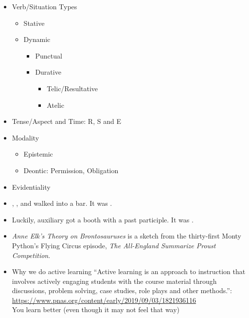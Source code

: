 \documentclass[headrule,footrule]{foils}
\begin{document}
\begin{itemize}\addtolength{\itemsep}{-1ex}
\item Verb/Situation Types
\begin{itemize}
\item Stative 
\item  Dynamic
  \begin{itemize}
  \item  Punctual
  \item  Durative
    \begin{itemize}
    \item  Telic/Resultative 
    \item  Atelic
    \end{itemize}
  \end{itemize}
\end{itemize}
\item Tense/Aspect and Time: R, S and E
\item Modality
  \begin{itemize}
  \item Epistemic
  \item Deontic: Permission, Obligation
  \end{itemize}
\item Evidentiality
\end{itemize}


\begin{itemize}
\item {}, , and  walked into a bar. It was .
\item Luckily, auxiliary  got a booth with a past participle. It was .
\end{itemize}



\begin{itemize}
\item \textit{Anne Elk's Theory on Brontosauruses} is a sketch from the
  thirty-first Monty Python's Flying Circus episode, \textit{The All-England
  Summarize Proust Competition}.
\item Why we do active learning ``Active learning is an approach to instruction that involves actively engaging students with the course material through discussions, problem solving, case studies, role plays and other methods.'':
  \\ \url{https://www.pnas.org/content/early/2019/09/03/1821936116}
  \\ You learn better (even though it may not feel that way)
\end{itemize}
\end{document}
